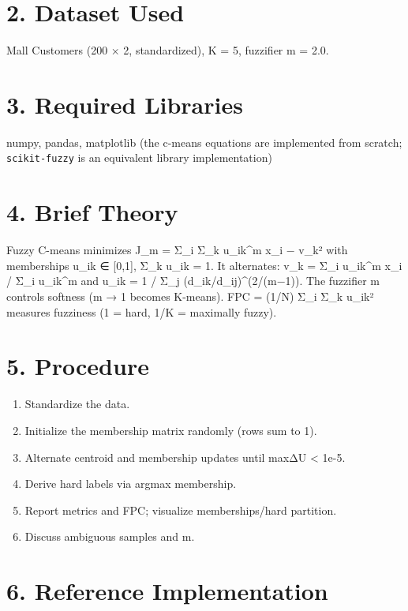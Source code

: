 \section{2. Dataset Used}\label{dataset-used-2}

Mall Customers (200 × 2, standardized), K = 5, fuzzifier m = 2.0.

\section{3. Required Libraries}\label{required-libraries-2}

numpy, pandas, matplotlib (the c-means equations are implemented from
scratch; \passthrough{\lstinline!scikit-fuzzy!} is an equivalent library
implementation)

\section{4. Brief Theory}\label{brief-theory-2}

Fuzzy C-means minimizes J\_m = Σ\_i Σ\_k u\_ik\^{}m
\textbar\textbar x\_i − v\_k\textbar\textbar² with memberships u\_ik ∈
{[}0,1{]}, Σ\_k u\_ik = 1. It alternates: v\_k = Σ\_i u\_ik\^{}m x\_i /
Σ\_i u\_ik\^{}m and u\_ik = 1 / Σ\_j (d\_ik/d\_ij)\^{}(2/(m−1)). The
fuzzifier m controls softness (m → 1 becomes K-means). FPC = (1/N) Σ\_i
Σ\_k u\_ik² measures fuzziness (1 = hard, 1/K = maximally fuzzy).

\section{5. Procedure}\label{procedure-2}

\begin{enumerate}
\def\labelenumi{\arabic{enumi}.}
\tightlist
\item
  Standardize the data.
\item
  Initialize the membership matrix randomly (rows sum to 1).
\item
  Alternate centroid and membership updates until
  max\textbar ΔU\textbar{} \textless{} 1e-5.
\item
  Derive hard labels via argmax membership.
\item
  Report metrics and FPC; visualize memberships/hard partition.
\item
  Discuss ambiguous samples and m.
\end{enumerate}

\section{6. Reference Implementation}\label{reference-implementation-2}

